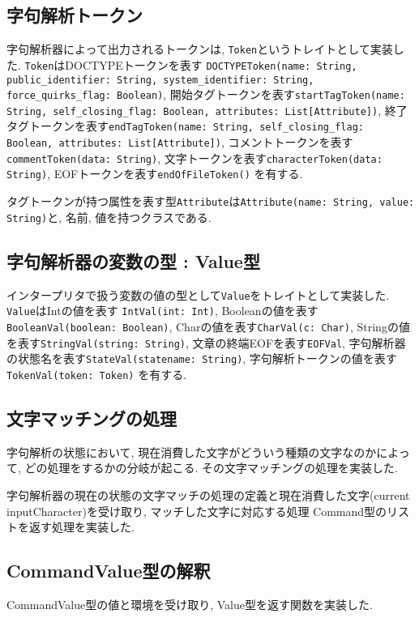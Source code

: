 \documentclass[uplatex,a4j]{jsreport}
\begin{document}
\subsection{字句解析トークン}
字句解析器によって出力されるトークンは, \texttt{Token}というトレイトとして実装した. 
\texttt{Token}はDOCTYPEトークンを表す \texttt{DOCTYPEToken(name: String, public_identifier: String, system_identifier: String, force_quirks_flag: Boolean)}, 
開始タグトークンを表す\texttt{startTagToken(name: String, self_closing_flag: Boolean, attributes: List[Attribute])}, 
終了タグトークンを表す\texttt{endTagToken(name: String, self_closing_flag: Boolean, attributes: List[Attribute])}, 
コメントトークンを表す\texttt{commentToken(data: String)}, 
文字トークンを表す\texttt{characterToken(data: String)}, 
EOFトークンを表す\texttt{endOfFileToken()} 
を有する. 

タグトークンが持つ属性を表す型\texttt{Attribute}は\texttt{Attribute(name: String, value: String)}と, 名前,  値を持つクラスである. 

\subsection{字句解析器の変数の型 : Value型}
インタープリタで扱う変数の値の型として\texttt{Value}をトレイトとして実装した. 
\texttt{Value}はIntの値を表す \texttt{IntVal(int: Int)}, 
Booleanの値を表す\texttt{BooleanVal(boolean: Boolean)}, 
Charの値を表す\texttt{CharVal(c: Char)}, 
Stringの値を表す\texttt{StringVal(string: String)}, 
文章の終端EOFを表す\texttt{EOFVal}, 
字句解析器の状態名を表す\texttt{StateVal(statename: String)}, 
字句解析トークンの値を表す\texttt{TokenVal(token: Token)} 
を有する.

\subsection{文字マッチングの処理}
字句解析の状態において, 
現在消費した文字がどういう種類の文字なのかによって, どの処理をするかの分岐が起こる. その文字マッチングの処理を実装した. 

字句解析器の現在の状態の文字マッチの処理の定義と現在消費した文字(current inputCharacter)を受け取り, 
マッチした文字に対応する処理 Command型のリストを返す処理を実装した. 

\subsection{CommandValue型の解釈}
CommandValue型の値と環境を受け取り, Value型を返す関数を実装した.
\end{document}
